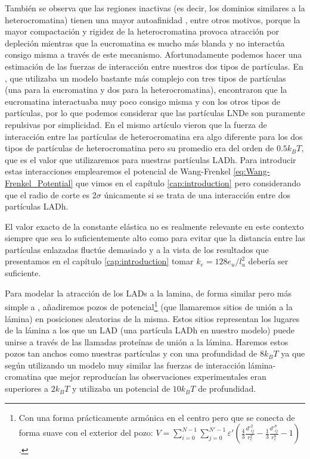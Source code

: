 También se observa que las regiones inactivas (es decir, los dominios similares a la heterocromatina) tienen una mayor autoafinidad \cite{Camara2023}, entre otros motivos, porque la mayor compactación y rigidez de la heterocromatina provoca atracción por depleción mientras que la eucromatina es mucho más blanda y no interactúa consigo misma a través de este mecanismo. Afortunadamente podemos hacer una estimación de las fuerzas de interacción entre nuestros dos tipos de partículas. En \cite{Falk2019}, que utilizaba un modelo bastante más complejo con tres tipos de partículas (una para la eucromatina y dos para la heterocromatina), encontraron que la eucromatina interactuaba muy poco consigo misma y con los otros tipos de partículas, por lo que podemos considerar que las partículas LNDe son puramente repulsivas por simplicidad. En el mismo artículo vieron que la fuerza de interacción entre las partículas de heterocromatina era algo diferente para los dos tipos de partículas de heterocromatina pero su promedio era del orden de $0.5k_BT$, que es el valor que utilizaremos para nuestras partículas LADh. Para introducir estas interacciones emplearemos el potencial de Wang-Frenkel \ref{eq:Wang-Frenkel_Potential} que vimos en el capítulo \ref{cap:introduction} pero considerando que el radio de corte es $2\sigma$ únicamente si se trata de una interacción entre dos partículas LADh.

El valor exacto de la constante elástica no es realmente relevante en este contexto siempre que sea lo suficientemente alto como para evitar que la distancia entre las partículas enlazadas fluctúe demasiado y a la vista de los resultados que presentamos en el capítulo \ref{cap:introduction} tomar $k_e=128e_u/l_u^2$ debería ser suficiente.

Para modelar la atracción de los LADs a la lamina, de forma similar pero más simple a \cite{Bajpai2021}, añadiremos pozos de potencial\footnote{Con una forma prácticamente armónica en el centro pero que se conecta de forma suave con el exterior del pozo: $V=\sum_{i=0}^{N-1}\sum_{j=0}^{N'-1}\varepsilon'\left(\frac{4}{3}\frac{{d'}_{ij}^{2}}{r_c^{2}}-\frac{1}{3}\frac{{d'}_{ij}^{8}}{r_c^{8}}-1\right)$.} (que llamaremos sitios de unión a la lámina) en posiciones aleatorias de la misma. Estos sitios representan los lugares de la lámina a los que un LAD (una partícula LADh en nuestro modelo) puede unirse a través de las llamadas proteínas de unión a la lámina. Haremos estos pozos tan anchos como nuestras partículas y con una profundidad de $8k_BT$ ya que según \cite{Maji2020} utilizando un modelo muy similar las fuerzas de interacción lámina-cromatina que mejor reproducían las observaciones experimentales eran superiores a $2k_BT$ y \cite{Bajpai2021} utilizaba un potencial de $10k_BT$ de profundidad.

